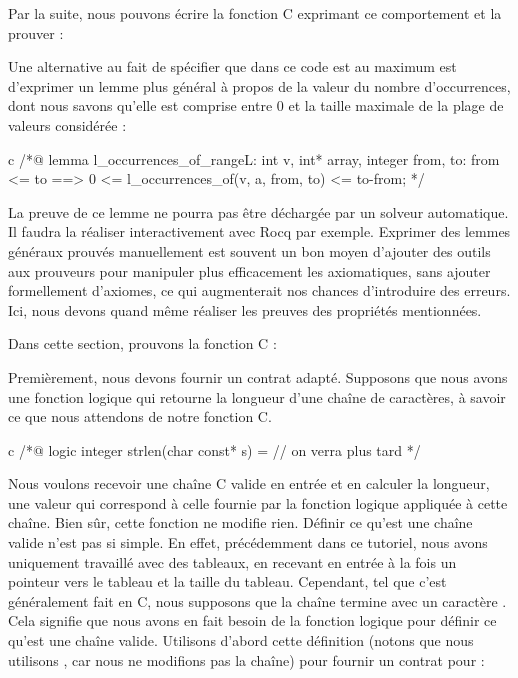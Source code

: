 Par la suite, nous pouvons écrire la fonction C exprimant ce comportement et la
prouver :






Une alternative au fait de spécifier que dans ce code  est au
maximum  est d'exprimer un lemme plus général à propos de la valeur
du nombre d'occurrences, dont nous savons qu'elle est comprise entre 0 et
la taille maximale de la plage de valeurs considérée :



\begin{CodeBlock}{c}
/*@
lemma l_occurrences_of_range{L}:
  \forall int v, int* array, integer from, to:
    from <= to ==> 0 <= l_occurrences_of(v, a, from, to) <= to-from;
*/
\end{CodeBlock}



La preuve de ce lemme ne pourra pas être déchargée par un solveur automatique. Il
faudra la réaliser interactivement avec Rocq par exemple. Exprimer des
lemmes généraux prouvés manuellement est souvent un bon moyen d'ajouter des
outils aux prouveurs pour manipuler plus efficacement les axiomatiques, sans
ajouter formellement d'axiomes, ce qui augmenterait nos chances d'introduire des
erreurs. Ici, nous devons quand même réaliser les preuves des propriétés
mentionnées.




Dans cette section, prouvons la fonction C  :




Premièrement, nous devons fournir un contrat adapté. Supposons que nous avons
une fonction logique  qui retourne la longueur d'une chaîne
de caractères, à savoir ce que nous attendons de notre fonction C.


\begin{CodeBlock}{c}
/*@
  logic integer strlen(char const* s) = // on verra plus tard
*/
\end{CodeBlock}


Nous voulons recevoir une chaîne C valide en entrée et en
calculer la longueur, une valeur qui correspond à celle fournie par la
fonction logique  appliquée à cette chaîne. Bien sûr,
cette fonction ne modifie rien. Définir ce qu'est une chaîne valide n'est
pas si simple. En effet, précédemment dans ce tutoriel, nous avons uniquement
travaillé avec des tableaux, en recevant en entrée à la fois un pointeur
vers le tableau et la taille du tableau. Cependant, tel que
c'est généralement fait en C, nous supposons que la chaîne termine avec
un caractère . Cela signifie que nous
avons en fait besoin de la fonction logique  pour
définir ce qu'est une chaîne valide. Utilisons d'abord cette définition
(notons que nous utilisons ,
car nous ne modifions pas la chaîne) pour fournir un contrat pour
 :



